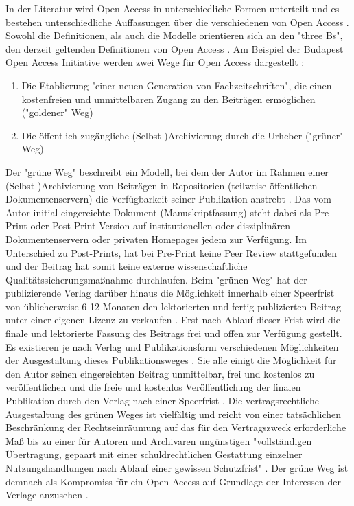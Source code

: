 In der Literatur wird Open Access in unterschiedliche Formen unterteilt \cite{CREATe_2014} \cite{albert_2006_open_implications} und es bestehen unterschiedliche Auffassungen über die verschiedenen  von Open Access \cite{CREATe_2014} \cite{cite:22b} \cite{lewis_2012_inevitability}. Sowohl die Definitionen, als auch die Modelle orientieren sich an den "three Bs", den derzeit geltenden Definitionen von Open Access \cite{Adema_2014_open_access}. Am Beispiel der Budapest Open Access Initiative werden zwei Wege für Open Access dargestellt \cite{albert_2006_open_implications}:
\begin{enumerate}
\item Die Etablierung "einer neuen Generation von Fachzeitschriften", die einen kostenfreien und unmittelbaren Zugang zu den Beiträgen ermöglichen ("goldener" Weg)
\item Die öffentlich zugängliche (Selbst-)Archivierung durch die Urheber ("grüner" Weg) \cite{adema_2013_political} \cite{hall_2008_digitize}
\end{enumerate}

Der "grüne Weg" beschreibt ein Modell, bei dem der Autor im Rahmen einer (Selbst-)Archivierung von Beiträgen in Repositorien (teilweise öffentlichen Dokumentenservern) die Verfügbarkeit seiner Publikation anstrebt \cite{brembs2015open} \cite{muller_2010_open} \cite{grand_2012_open}. Das vom Autor initial eingereichte Dokument (Manuskriptfassung) steht dabei als Pre-Print oder Post-Print-Version auf institutionellen oder disziplinären Dokumentenservern \cite{suchen} oder privaten Homepages \cite{suchen} jedem zur Verfügung. Im Unterschied zu Post-Prints, hat bei Pre-Print keine Peer Review stattgefunden \cite{suchen} und der Beitrag hat somit keine externe wissenschaftliche Qualitätssicherungsmaßnahme durchlaufen. Beim "grünen Weg" hat der publizierende Verlag darüber hinaus die Möglichkeit innerhalb einer Speerfrist von üblicherweise 6-12 Monaten \cite{suchen} den lektorierten und fertig-publizierten Beitrag unter einer eigenen Lizenz zu verkaufen \cite{suchen}. Erst nach Ablauf dieser Frist wird die finale und lektorierte Fassung des Beitrags frei und offen zur Verfügung gestellt. Es existieren je nach Verlag und Publikationsform verschiedenen Möglichkeiten der Ausgestaltung dieses Publikationsweges \cite{suchen}. Sie alle einigt die Möglichkeit für den Autor seinen eingereichten Beitrag unmittelbar, frei und kostenlos zu veröffentlichen und die freie und kostenlos Veröffentlichung der finalen Publikation durch den Verlag nach einer Speerfrist \cite{dorschel_2006_open}. Die vertragsrechtliche Ausgestaltung des grünen Weges ist vielfältig und reicht von einer tatsächlichen Beschränkung der Rechtseinräumung auf das für den Vertragszweck erforderliche Maß bis zu einer für Autoren und Archivaren ungünstigen "vollständigen Übertragung, gepaart mit einer schuldrechtlichen Gestattung einzelner Nutzungshandlungen nach Ablauf einer gewissen Schutzfrist" \cite{dorschel_2006_open}. Der grüne Weg ist demnach als Kompromiss für ein Open Access auf Grundlage der Interessen der Verlage anzusehen \cite{Mussell_2013}.


